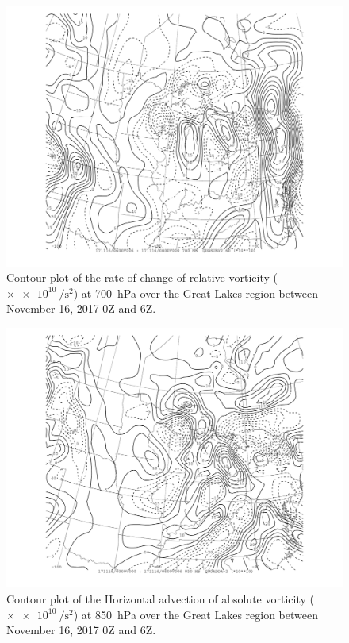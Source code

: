 \documentclass[11pt]{article}
\begin{document}
\begin{figure}[h!]
	\centering
	\includegraphics[width=\textwidth,trim={2.5cm 1cm 2.5cm 0},clip]{dvordt_700hPa_MI}
	\caption{Contour plot of the rate of change of relative vorticity ($\times \SI{e10}{\per\s\squared}$) at \SI{700}{\hecto\Pa} over the Great Lakes region between November 16, 2017 0Z and 6Z.}
	\label{fig:dvordt_700hPa_MI}
\end{figure}

\begin{figure}[h!]
  \centering
  \includegraphics[width=\textwidth,trim={2.5cm 1cm 2.5cm 0},clip]{hor_adv_vor_MI_850hPa}
  \caption{Contour plot of the Horizontal advection of absolute vorticity ($\times \SI{e10}{\per\s\squared}$) at \SI{850}{\hecto\Pa} over the Great Lakes region between November 16, 2017 0Z and 6Z.}
  \label{fig:hor_adv_vor_MI_850hPa}
\end{figure}
\end{document}
